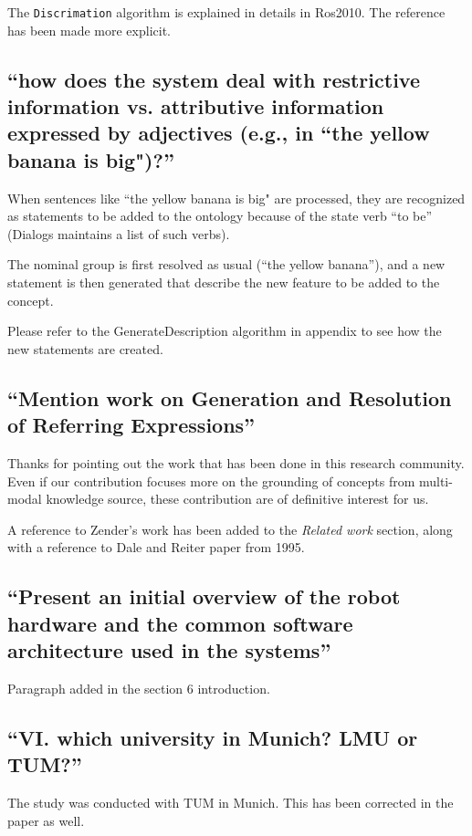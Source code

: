 \documentclass[11pt]{article}
\begin{document}
The {\tt Discrimation} algorithm is explained in details in Ros2010. The
reference has been made more explicit.

\subsection{``how does the system deal with restrictive information vs.
attributive information expressed by adjectives (e.g., in ``the yellow banana is
big")?''}

When sentences like ``the yellow banana is big" are processed, they are
recognized as statements to be added to the ontology because of the state verb ``to be''
({\sc Dialogs} maintains a list of such verbs).

The nominal group is first resolved as usual (``the yellow banana''), and a new statement
is then generated that describe the new feature to be added to the concept.

Please refer to the {\sc GenerateDescription} algorithm in appendix to see how the
new statements are created.

\subsection{``Mention work on Generation and Resolution of Referring Expressions''}

Thanks for pointing out the work that has been done in this research community.
Even if our contribution focuses more on the grounding of concepts from 
multi-modal knowledge source, these contribution are of definitive 
interest for us.

A reference to Zender's work has been added to the \emph{Related work} 
section, along with a reference to Dale and Reiter paper from 1995.

\subsection{``Present an initial overview of the
robot hardware and the common software architecture used in the systems''}

Paragraph added in the section 6 introduction.

\subsection{``VI. which university in Munich? LMU or TUM?''}

The study was conducted with TUM in Munich. This has been corrected in 
the paper as well.
\end{document}

